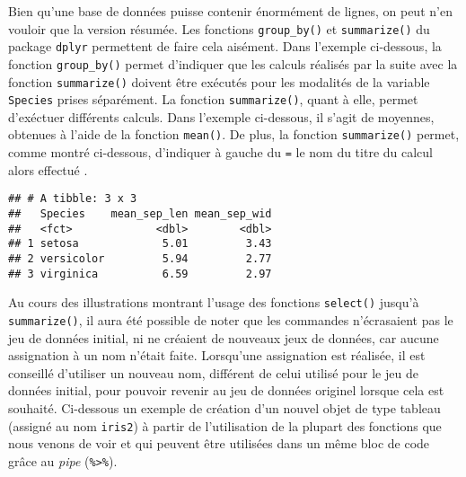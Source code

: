 \documentclass[
  french,
]{book}
\newenvironment{Shaded}{\begin{snugshade}}{\end{snugshade}}
\newcommand{\DataTypeTok}[1]{\textcolor[rgb]{0.13,0.29,0.53}{#1}}
\newcommand{\KeywordTok}[1]{\textcolor[rgb]{0.13,0.29,0.53}{\textbf{#1}}}
\newcommand{\NormalTok}[1]{#1}
\newcommand{\OperatorTok}[1]{\textcolor[rgb]{0.81,0.36,0.00}{\textbf{#1}}}
\newcommand{\StringTok}[1]{\textcolor[rgb]{0.31,0.60,0.02}{#1}}
\begin{document}
Bien qu'une base de données puisse contenir énormément de lignes, on peut n'en vouloir que la version résumée. Les fonctions \texttt{group\_by()} et \texttt{summarize()} du package \texttt{dplyr} permettent de faire cela aisément. Dans l'exemple ci-dessous, la fonction \texttt{group\_by()} permet d'indiquer que les calculs réalisés par la suite avec la fonction \texttt{summarize()} doivent être exécutés pour les modalités de la variable \texttt{Species} prises séparément. La fonction \texttt{summarize()}, quant à elle, permet d'exéctuer différents calculs. Dans l'exemple ci-dessous, il s'agit de moyennes, obtenues à l'aide de la fonction \texttt{mean()}. De plus, la fonction \texttt{summarize()} permet, comme montré ci-dessous, d'indiquer à gauche du \texttt{=} le nom du titre du calcul alors effectué .

\begin{Shaded}
\end{Shaded}

\begin{verbatim}
## # A tibble: 3 x 3
##   Species    mean_sep_len mean_sep_wid
##   <fct>             <dbl>        <dbl>
## 1 setosa             5.01         3.43
## 2 versicolor         5.94         2.77
## 3 virginica          6.59         2.97
\end{verbatim}

Au cours des illustrations montrant l'usage des fonctions \texttt{select()} jusqu'à \texttt{summarize()}, il aura été possible de noter que les commandes n'écrasaient pas le jeu de données initial, ni ne créaient de nouveaux jeux de données, car aucune assignation à un nom n'était faite. Lorsqu'une assignation est réalisée, il est conseillé d'utiliser un nouveau nom, différent de celui utilisé pour le jeu de données initial, pour pouvoir revenir au jeu de données originel lorsque cela est souhaité. Ci-dessous un exemple de création d'un nouvel objet de type tableau (assigné au nom \texttt{iris2}) à partir de l'utilisation de la plupart des fonctions que nous venons de voir et qui peuvent être utilisées dans un même bloc de code grâce au \emph{pipe} (\texttt{\%\textgreater{}\%}).
\end{document}
